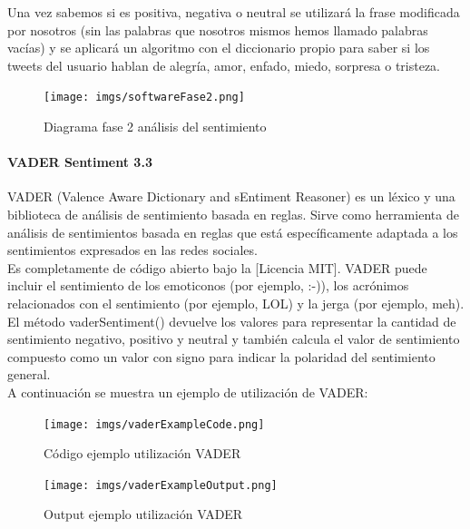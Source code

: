 \documentclass[../all.tex]{subfiles}
\begin{document}
    	Una vez sabemos si es positiva, negativa o neutral se utilizará la frase modificada por nosotros (sin las palabras que nosotros mismos hemos llamado palabras vacías) y se aplicará un algoritmo con el diccionario propio para saber si los tweets del usuario hablan de alegría, amor, enfado, miedo, sorpresa o tristeza.
        
        \begin{figure}[H]
        	\centering
        	\texttt{[image: imgs/softwareFase2.png]}
        	\caption{Diagrama fase 2 análisis del sentimiento}
        \end{figure}
    
    	\newpage
        \paragraph{VADER Sentiment 3.3}
        
        	VADER (Valence Aware Dictionary and sEntiment Reasoner) es un léxico y una biblioteca de análisis de sentimiento basada en reglas. Sirve como herramienta de análisis de sentimientos basada en reglas que está específicamente adaptada a los sentimientos expresados en las redes sociales.\\
        	
        	 Es completamente de código abierto bajo la [Licencia MIT]. VADER puede incluir el sentimiento de los emoticonos (por ejemplo, :-)), los acrónimos relacionados con el sentimiento (por ejemplo, LOL) y la jerga (por ejemplo, meh).\\
        	 
        	 El método vaderSentiment() devuelve los valores para representar la cantidad de sentimiento negativo, positivo y neutral y también calcula el valor de sentimiento compuesto como un valor con signo para indicar la polaridad del sentimiento general.\\
        	 
        	 A continuación se muestra un ejemplo de utilización de VADER:
        	 \begin{figure}[H]
        	 	\centering
        	 	\texttt{[image: imgs/vaderExampleCode.png]}
        	 	\caption{Código ejemplo utilización VADER}
        	 \end{figure}
        	\begin{figure}[H]
        		\centering
        		\texttt{[image: imgs/vaderExampleOutput.png]}
        		\caption{Output ejemplo utilización VADER}
        	\end{figure}
        
\end{document}
